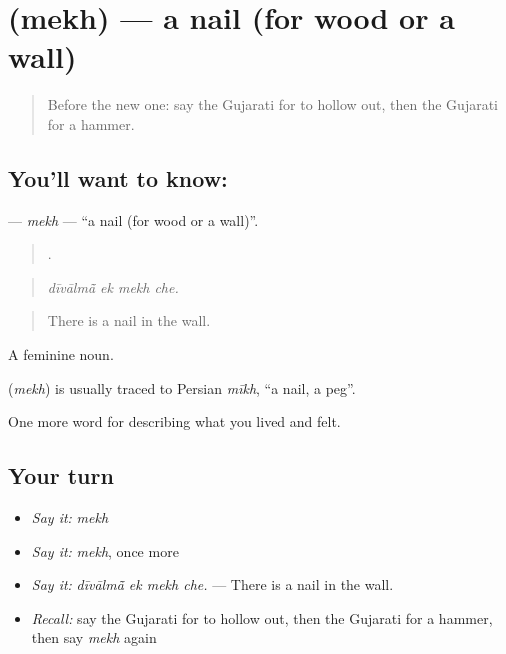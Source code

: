 \section[\texorpdfstring{\gu{મેખ} (mekh)}{મેખ (mekh)}]{ (mekh) — a nail (for wood or a wall)}

\label{lesson:GU-C502-mekh}



\begin{quote}
Before the new one: say the Gujarati for to hollow out, then the Gujarati for a hammer.
\end{quote}

\subsection*{You'll want to know: }
\textbf{} — \emph{mekh} — \textquotedblleft{}a nail (for wood or a wall)\textquotedblright{}.

\begin{quote}
   .
\end{quote}

\begin{quote}
\emph{dīvālmā̃ ek mekh che.}
\end{quote}

\begin{quote}
There is a nail in the wall.
\end{quote}

A feminine noun.

\begin{cousinweb}
\textbf{} (\emph{mekh}) is usually traced to Persian \emph{mīkh}, \textquotedblleft{}a nail, a peg\textquotedblright{}.
\end{cousinweb}

\begin{grammarlens}[title={What you've built}]
One more word for describing what you lived and felt.
\end{grammarlens}

\subsection*{Your turn}
\begin{itemize}
\raggedright
  \item \emph{Say it:} \emph{mekh}
  \item \emph{Say it:} \emph{mekh}, once more
  \item \emph{Say it:} \emph{dīvālmā̃ ek mekh che.} — There is a nail in the wall.
  \item \emph{Recall:} say the Gujarati for to hollow out, then the Gujarati for a hammer, then say \emph{mekh} again
\end{itemize}

